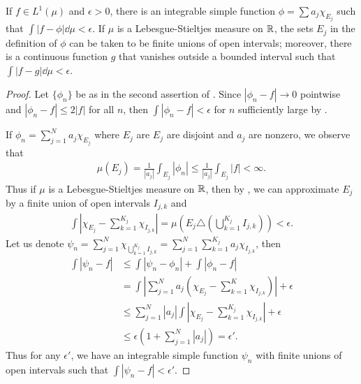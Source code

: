 \begin{theorem}
    If $f \in L^{1} (\mu)$ and $\epsilon > 0$, there is an integrable simple function $\phi = \sum a_j \chi_{E_j}$ such that $\int |f - \phi| \dd \mu < \epsilon$.
    If $\mu$ is a Lebesgue-Stieltjes measure on $\mathbb{R}$, the sets $E_j$ in the definition of $\phi$ can be taken to be finite unions of open intervals;
    moreover, there is a continuous function $g$ that vanishes outside a bounded interval such that $\int |f - g| \dd \mu < \epsilon$.
\end{theorem}

\begin{proof}
    Let $\{ \phi_n \}$ be as in the second assertion of .
    Since $|\phi_n - f| \to 0$ pointwise and $|\phi_n - f| \le 2 |f|$ for all $n$, then $\int |\phi_n - f| < \epsilon$ for $n$ sufficiently large by .

    If $\phi_n = \sum_{j=1}^{N} a_j \chi_{E_j}$ where $E_j$ are $E_j$ are disjoint and $a_j$ are nonzero, we observe that 
    \begin{align}
        \mu(E_j) = \frac{1}{|a_j|} \int_{E_j} |\phi_n| \le \frac{1}{|a_j|} \int_{E_j} |f| < \infty.
    \end{align}
    Thus if $\mu$ is a Lebesgue-Stieltjes measure on $\mathbb{R}$, then by , we can approximate $E_j$ by a finite union of open intervals $I_{j,k}$ and 
    \begin{align}
        \int \left| \chi_{E_j} - \sum_{k=1}^{K_j} \chi_{I_{j,k}} \right| = \mu \left( E_j \triangle (\bigcup_{k=1}^{K_j} I_{j,k}) \right) < \epsilon.
    \end{align}
    Let us denote $\psi_n = \sum_{j=1}^{N} \chi_{\bigcup_{k=1}^{K_j} I_{j,k}} = \sum_{j=1}^{N} \sum_{k=1}^{K_j} a_j \chi_{I_{j,k}}$, then
    \begin{align}
        \int |\psi_n - f| & \le \int |\psi_n - \phi_n| + \int |\phi_n - f| \\
        & = \int \left| \sum_{j=1}^{N} a_j \left( \chi_{E_j} - \sum_{k=1}^{K} \chi_{I_{j,k}} \right) \right| + \epsilon \\
        & \le \sum_{j=1}^{N} |a_j| \int \left| \chi_{E_j} - \sum_{k=1}^{K_j} \chi_{I_{j,k}} \right| + \epsilon \\
        & \le \epsilon \left(1+ \sum_{j=1}^{N} |a_j| \right) = \epsilon'.
    \end{align}
    Thus for any $\epsilon'$, we have an integrable simple function $\psi_n$ with finite unions of open intervals such that $\int |\psi_n - f| < \epsilon'$.
    

\end{proof}
